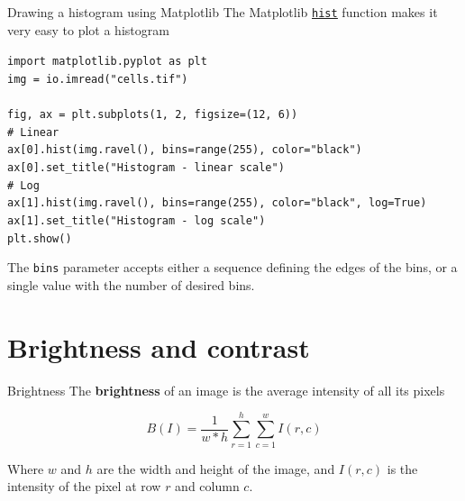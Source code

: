 \documentclass[9pt, aspectratio=169]{beamer}
\begin{document}
\begin{frame}
    {Drawing a histogram using Matplotlib}
    The Matplotlib \href{https://matplotlib.org/stable/api/_as_gen/matplotlib.pyplot.hist.html}{\underline{\texttt{hist}}} function makes it very easy to plot a histogram

    \begin{codebox}
        \texttt{import matplotlib.pyplot as plt\\
            img = io.imread("cells.tif")\\
            \\
            fig, ax = plt.subplots(1, 2, figsize=(12, 6))\\
            \# Linear\\
            ax[0].hist(img.ravel(), bins=range(255), color="black")\\
            ax[0].set\_title("Histogram - linear scale")\\
            \pause
            \# Log\\
            ax[1].hist(img.ravel(), bins=range(255), color="black", log=True)\\
            ax[1].set\_title("Histogram - log scale")\\
            plt.show()}
    \end{codebox}

    The \texttt{bins} parameter accepts either a sequence defining the edges of the bins, or a single value with the number of desired bins.
\end{frame}

\section {Brightness and contrast}

\begin{frame}
    {Brightness}
    The \textbf{brightness} of an image is the average intensity of all its pixels

    $$B(I) = \frac{1}{w*h}\sum_{r=1}^{h}\sum_{c=1}^{w}I(r,c)$$

    Where $w$ and $h$ are the width and height of the image, and $I(r,c)$ is the intensity of the pixel at row $r$ and column $c$.
    \pause
\end{frame}
\end{document}
